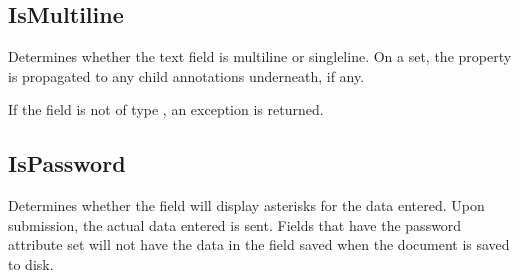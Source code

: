 \documentclass[letterpaper,12pt,english,openany,oneside]{sphinxmanual}
\begin{document}
\begin{sphinxVerbatim}[commandchars=\\\{\}]
   
  
\end{sphinxVerbatim}




\subsection{IsMultiline}
\label{\detokenize{IAC_API_FormsIntro:ismultiline}}
Determines whether the text field is multi\sphinxhyphen{}line or single\sphinxhyphen{}line. On a set, the property is propagated to any child annotations underneath, if any.

\label{\detokenize{IAC_API_FormsIntro:syntax-20}}

\begin{sphinxVerbatim}[commandchars=\\\{\}]
\PYG{p}{[}\PYG{p}{]} 
\end{sphinxVerbatim}
\label{\detokenize{IAC_API_FormsIntro:exceptions-12}}

If the field is not of type , an exception  is returned.

\label{\detokenize{IAC_API_FormsIntro:example-14}}

\begin{sphinxVerbatim}[commandchars=\\\{\}]
  
\end{sphinxVerbatim}




\subsection{IsPassword}
\label{\detokenize{IAC_API_FormsIntro:ispassword}}
Determines whether the field will display asterisks for the data entered. Upon submission, the actual data entered is sent. Fields that have the password attribute set will not have the data in the field saved when the document is saved to disk.
\end{document}
